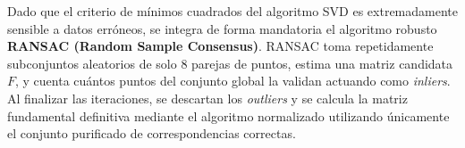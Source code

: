 \noindent
Dado que el criterio de mínimos cuadrados del algoritmo SVD es extremadamente sensible a datos erróneos, se integra de forma mandatoria el algoritmo robusto \textbf{RANSAC (Random Sample Consensus)}. RANSAC toma repetidamente subconjuntos aleatorios de solo 8 parejas de puntos, estima una matriz candidata $F$, y cuenta cuántos puntos del conjunto global la validan actuando como \textit{inliers}. Al finalizar las iteraciones, se descartan los \textit{outliers} y se calcula la matriz fundamental definitiva mediante el algoritmo normalizado utilizando únicamente el conjunto purificado de correspondencias correctas.
